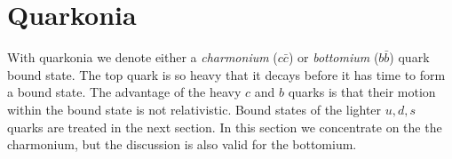 \documentclass[12pt]{article}
\begin{document}
\section{Quarkonia}
With quarkonia we denote either a \emph{charmonium} ($c\bar c$) or \emph{bottomium} ($b\bar b$) quark bound state. The top quark is so heavy that it decays before it has time to form a bound state. The advantage of the heavy $c$ and $b$ quarks is that their motion within the bound state is not relativistic. Bound states of the lighter $u,d,s$ quarks are treated in the next section. In this section we concentrate on the the charmonium, but the discussion is also valid for the bottomium.
\end{document}

